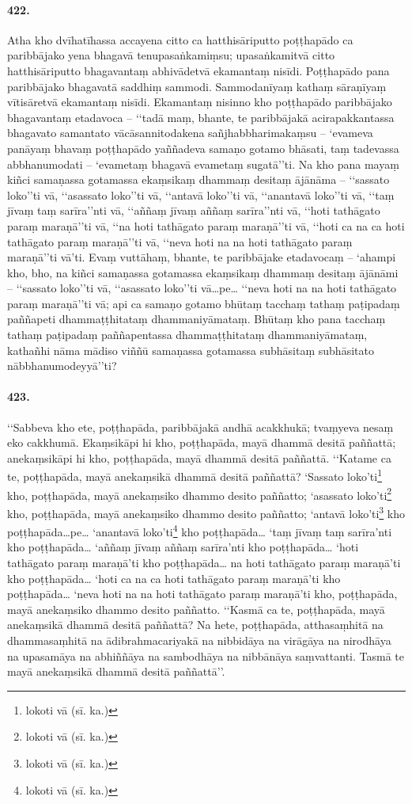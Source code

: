 \paragraph{422.} Atha kho dvīhatīhassa accayena citto ca hatthisāriputto poṭṭhapādo ca paribbājako yena bhagavā tenupasaṅkamiṃsu; upasaṅkamitvā citto hatthisāriputto bhagavantaṃ abhivādetvā ekamantaṃ nisīdi. Poṭṭhapādo pana paribbājako bhagavatā saddhiṃ sammodi. Sammodanīyaṃ kathaṃ sāraṇīyaṃ vītisāretvā ekamantaṃ nisīdi. Ekamantaṃ nisinno kho poṭṭhapādo paribbājako bhagavantaṃ etadavoca – ‘‘tadā maṃ, bhante, te paribbājakā acirapakkantassa bhagavato samantato vācāsannitodakena sañjhabbharimakaṃsu – ‘evameva panāyaṃ bhavaṃ poṭṭhapādo yaññadeva samaṇo gotamo bhāsati, taṃ tadevassa abbhanumodati – ‘evametaṃ bhagavā evametaṃ sugatā’’ti. Na kho pana mayaṃ kiñci samaṇassa gotamassa ekaṃsikaṃ dhammaṃ desitaṃ ājānāma – ‘‘sassato loko’’ti vā, ‘‘asassato loko’’ti vā, ‘‘antavā loko’’ti vā, ‘‘anantavā loko’’ti vā, ‘‘taṃ jīvaṃ taṃ sarīra’’nti vā, ‘‘aññaṃ jīvaṃ aññaṃ sarīra’’nti vā, ‘‘hoti tathāgato paraṃ maraṇā’’ti vā, ‘‘na hoti tathāgato paraṃ maraṇā’’ti vā, ‘‘hoti ca na ca hoti tathāgato paraṃ maraṇā’’ti vā, ‘‘neva hoti na na hoti tathāgato paraṃ maraṇā’’ti vā’ti. Evaṃ vuttāhaṃ, bhante, te paribbājake etadavocaṃ – ‘ahampi kho, bho, na kiñci samaṇassa gotamassa ekaṃsikaṃ dhammaṃ desitaṃ ājānāmi – ‘‘sassato loko’’ti vā, ‘‘asassato loko’’ti vā…pe… ‘‘neva hoti na na hoti tathāgato paraṃ maraṇā’’ti vā; api ca samaṇo gotamo bhūtaṃ tacchaṃ tathaṃ paṭipadaṃ paññapeti dhammaṭṭhitataṃ dhammaniyāmataṃ. Bhūtaṃ kho pana tacchaṃ tathaṃ paṭipadaṃ paññapentassa dhammaṭṭhitataṃ dhammaniyāmataṃ, kathañhi nāma mādiso viññū samaṇassa gotamassa subhāsitaṃ subhāsitato nābbhanumodeyyā’’ti?

\paragraph{423.} ‘‘Sabbeva kho ete, poṭṭhapāda, paribbājakā andhā acakkhukā; tvaṃyeva nesaṃ eko cakkhumā. Ekaṃsikāpi hi kho, poṭṭhapāda, mayā dhammā desitā paññattā; anekaṃsikāpi hi kho, poṭṭhapāda, mayā dhammā desitā paññattā. ‘‘Katame ca te, poṭṭhapāda, mayā anekaṃsikā dhammā desitā paññattā? ‘Sassato loko’ti\footnote{lokoti vā (sī. ka.)} kho, poṭṭhapāda, mayā anekaṃsiko dhammo desito paññatto; ‘asassato loko’ti\footnote{lokoti vā (sī. ka.)} kho, poṭṭhapāda, mayā anekaṃsiko dhammo desito paññatto; ‘antavā loko’ti\footnote{lokoti vā (sī. ka.)} kho poṭṭhapāda…pe… ‘anantavā loko’ti\footnote{lokoti vā (sī. ka.)} kho poṭṭhapāda… ‘taṃ jīvaṃ taṃ sarīra’nti kho poṭṭhapāda… ‘aññaṃ jīvaṃ aññaṃ sarīra’nti kho poṭṭhapāda… ‘hoti tathāgato paraṃ maraṇā’ti kho poṭṭhapāda… na hoti tathāgato paraṃ maraṇā’ti kho poṭṭhapāda… ‘hoti ca na ca hoti tathāgato paraṃ maraṇā’ti kho poṭṭhapāda… ‘neva hoti na na hoti tathāgato paraṃ maraṇā’ti kho, poṭṭhapāda, mayā anekaṃsiko dhammo desito paññatto. ‘‘Kasmā ca te, poṭṭhapāda, mayā anekaṃsikā dhammā desitā paññattā? Na hete, poṭṭhapāda, atthasaṃhitā na dhammasaṃhitā na ādibrahmacariyakā na nibbidāya na virāgāya na nirodhāya na upasamāya na abhiññāya na sambodhāya na nibbānāya saṃvattanti. Tasmā te mayā anekaṃsikā dhammā desitā paññattā’’.

